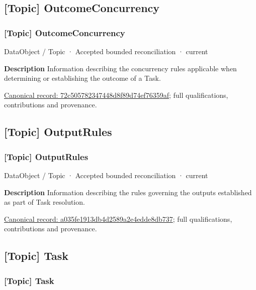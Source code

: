 \subsection{[Topic] OutcomeConcurrency}

\subsubsection{[Topic] OutcomeConcurrency}

\label{element:72c505782347448d8f89d74ef76359af}
{\small DataObject / Topic · Accepted bounded reconciliation · current}\par

\textbf{Description}
Information describing the concurrency rules applicable when determining or establishing the outcome of a Task.


{\footnotesize \href{../../../../continuum/application/data-object/topic/72c505782347448d8f89d74ef76359af.md}{Canonical record: 72c505782347448d8f89d74ef76359af}; full qualifications, contributions and provenance.}\par
\subsection{[Topic] OutputRules}

\subsubsection{[Topic] OutputRules}

\label{element:a035fe1913db4d2589a2e4edde8db737}
{\small DataObject / Topic · Accepted bounded reconciliation · current}\par

\textbf{Description}
Information describing the rules governing the outputs established as part of Task resolution.


{\footnotesize \href{../../../../continuum/application/data-object/topic/a035fe1913db4d2589a2e4edde8db737.md}{Canonical record: a035fe1913db4d2589a2e4edde8db737}; full qualifications, contributions and provenance.}\par
\subsection{[Topic] Task}

\subsubsection{[Topic] Task}

